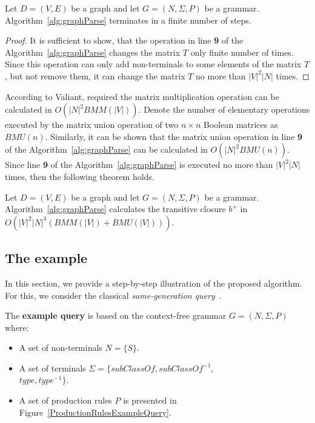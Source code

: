 \begin{mytheorem}\label{thm:finite}
 Let $D = (V,E)$ be a graph and let $G =(N,\Sigma,P)$ be a grammar. Algorithm~\ref{alg:graphParse} terminates in a finite number of steps. 
\end{mytheorem}
\begin{proof}
It is sufficient to show, that the operation in line \textbf{9} of the Algorithm~\ref{alg:graphParse} changes the matrix $T$ only finite number of times. Since this operation can only add non-terminals to some elements of the matrix $T$, but not remove them, it can change the matrix $T$ no more than $|V|^2|N|$ times.
\end{proof}

According to Valiant, required the matrix multiplication operation can be calculated in $O(|N|^2 BMM(|V|))$. Denote the number of elementary operations executed by the matrix union operation of two $n \times n$ Boolean matrices as $BMU(n)$. Similarly, it can be shown that the matrix union operation in line \textbf{9} of the Algorithm~\ref{alg:graphParse} can be calculated in $O(|N|^2 BMU(n))$. Since line \textbf{9} of the Algorithm~\ref{alg:graphParse} is executed no more than $|V|^2|N|$ times, then the following theorem holds.

\begin{mytheorem}\label{thm:time}
 Let $D = (V,E)$ be a graph and let $G =(N,\Sigma,P)$ be a grammar. Algorithm~\ref{alg:graphParse} calculates the transitive closure $b^+$ in $O(|V|^2|N|^3(BMM(|V|) + BMU(|V|)))$.
\end{mytheorem}



\subsection{The example} \label{section_example}
In this section, we provide a step-by-step illustration of the proposed algorithm. For this, we consider the classical \textit{same-generation query}~\cite{FndDB}.

The \textbf{example query} is based on the context-free grammar $G = (N, \Sigma, P)$ where:
\begin{itemize}
    \item A set of non-terminals $N = \{S\}$.
    \item A set of terminals $\Sigma = \{subClassOf, subClassOf^{-1},$ \\ $type, type^{-1}\}$.
    \item A set of production rules $P$ is presented in Figure~\ref{ProductionRulesExampleQuery}.
\end{itemize}

